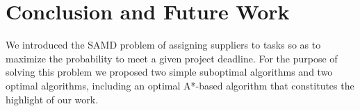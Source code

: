 \documentclass[letterpaper]{article} %
\newtheorem{theorem}{Theorem}
\newtheorem{lemma}{Lemma}
\newcommand{\samd}{\ac{SAMD}\xspace}
\newcommand{\astar}{\textsc{A*}\xspace}
\newcommand{\sampling}{\textsc{Sampling}\xspace}
\newcommand{\expectation}{\textsc{Expectation}\xspace}
\newcommand{\optapprox}{\textsc{OptApprox}\xspace}
\newcommand{\appr}{\textsc{Approx}\xspace}
\newcommand{\astarapprox}{\textsc{A*$_\appr$}\xspace}
\begin{document}

\section{Conclusion and Future Work}
\label{sec:conc}

We introduced the \samd problem of assigning suppliers to tasks so as to maximize the probability to meet a given project deadline. For the purpose of solving this problem we proposed two simple suboptimal algorithms and two optimal algorithms, including an optimal \astar-based algorithm that constitutes the highlight of our work.
\end{document}
